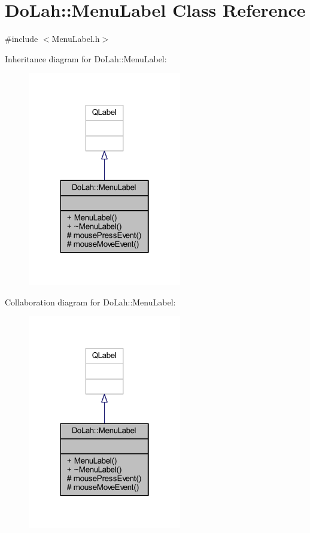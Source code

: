 \hypertarget{class_do_lah_1_1_menu_label}{}\section{Do\+Lah\+:\+:Menu\+Label Class Reference}
\label{class_do_lah_1_1_menu_label}


{\ttfamily \#include $<$Menu\+Label.\+h$>$}



Inheritance diagram for Do\+Lah\+:\+:Menu\+Label\+:\nopagebreak
\begin{figure}[H]
\begin{center}
\leavevmode
\includegraphics[width=190pt]{class_do_lah_1_1_menu_label__inherit__graph}
\end{center}
\end{figure}


Collaboration diagram for Do\+Lah\+:\+:Menu\+Label\+:\nopagebreak
\begin{figure}[H]
\begin{center}
\leavevmode
\includegraphics[width=190pt]{class_do_lah_1_1_menu_label__coll__graph}
\end{center}
\end{figure}

